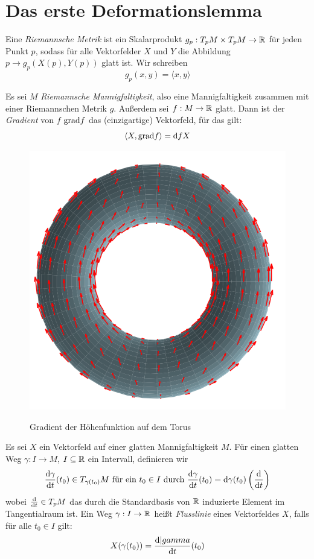 \section{Das erste Deformationslemma}

\begin{definition}
    Eine \textit{Riemannsche Metrik} ist ein Skalarprodukt 
    $g_p:T_pM \times T_pM \to \R$ für jeden Punkt $p$, sodass für alle 
    Vektorfelder $X$ und $Y$ die Abbildung $p \to g_p(X(p), Y(p))$ glatt ist.
    Wir schreiben 
    \[ g_p(x, y) = \langle x, y \rangle \]
\end{definition}

\begin{definition}[Gradient]
    Es sei $M$ \textit{Riemannsche Mannigfaltigkeit}, also eine Mannigfaltigkeit
    zusammen mit einer Riemannschen Metrik $g$. Außerdem sei $f: M \to \R$ glatt.
    Dann ist der \textit{Gradient} von $f$ $\grad f$ das (einzigartige) 
    Vektorfeld, für das gilt:
    \[ \langle X, \grad f \rangle = \opd fX \]
\end{definition}

\begin{figure}[H]
    \centering
    \includegraphics[width=0.7\linewidth]{resources/Me-Diagram4-gradient-of-hightmapping.png}
    \label{fig:me-diagram4}
    \caption{Gradient der Höhenfunktion auf dem Torus}
\end{figure}

\begin{definition}
    Es sei $X$ ein Vektorfeld auf einer glatten Mannigfaltigkeit $M$. Für einen
    glatten Weg $\gamma: I \to M$, $I \subseteq \R$ ein Intervall, 
    definieren wir
    \[ \derive[\gamma]{t}(t_0) \in T_{\gamma(t_0)}M \text{ für ein } t_0 \in I \text{ durch } 
    \derive[\gamma]{t}(t_0) = \opd \gamma (t_0) \left(\derive{t}\right) \]
    wobei $\derive{t} \in T_pM$ das durch die Standardbasis von $\R$
    induzierte Element im Tangentialraum ist.
    Ein Weg $\gamma: I \to \R$ heißt \textit{Flusslinie} eines Vektorfeldes $X$,
    falls für alle $t_0 \in I$ gilt:
    \[ X(\gamma(t_0)) = \derive[|gamma]{t}(t_0) \]
\end{definition}

